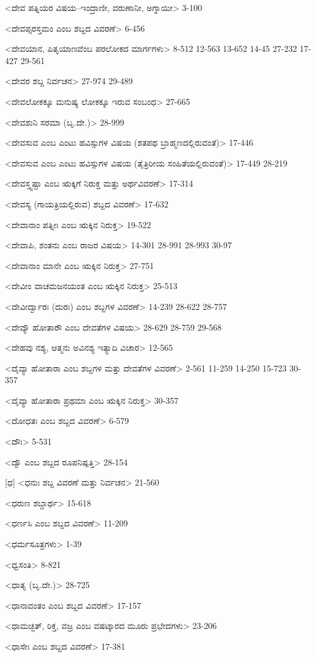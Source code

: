 <ದೇವ ಪತ್ನಿಯರ ವಿಷಯ–ಇಂದ್ರಾಣೀ, ವರುಣಾನೀ, ಅಗ್ನಾಯೀ>
3-100

<ದೇವಪ್ಸರಸ್ತಮಂ ಎಂಬ ಶಬ್ದದ ವಿವರಣೆ>
6-456

<ದೇವಯಾನ, ಪಿತೃಯಾಣವೆಂಬ ಪರಲೋಕದ ಮಾರ್ಗಗಳು>
8-512 
12-563 
13-652
14-45 
27-232 
17-427 
29-561

<ದೇವರ ಶಬ್ದ ನಿರ್ವಚನ>
27-974 
29-489

<ದೇವಲೋಕಕ್ಕೂ ಮನುಷ್ಯ ಲೋಕಕ್ಕೂ ಇರುವ ಸಂಬಂಧ>
27-665

<ದೇವಶುನಿ ಸರಮಾ (ಬೃ.ದೇ.)>
28-999

<ದೇವಸುವ ಎಂಬ ಎಂಟು ಹವಿಸ್ಸುಗಳ ವಿಷಯ (ಶತಪಥ ಬ್ರಾಹ್ಮಣದಲ್ಲಿರುವಂತೆ)>
17-446

<ದೇವಸುವ ಎಂಬ ಎಂಟು ಹವಿಸ್ಸುಗಳ ವಿಷಯ (ತೈತ್ರಿರೀಯ ಸಂಹಿತೆಯಲ್ಲಿರುವಂತೆ)>
17-449 
28-219

<ದೇವಸ್ತ್ವಷ್ಟಾ ಎಂಬ ಋಕ್ಕಿಗೆ ನಿರುಕ್ತ ಮತ್ತು ಅರ್ಥವಿವರಣೆ>
17-314

<ದೇವಸ್ಯ (ಗಾಯತ್ರಿಯಲ್ಲಿರುವ) ಶಬ್ದದ ವಿವರಣೆ>
17-632

<ದೇವಾನಾಂ ಪತ್ನೀಃ ಎಂಬ ಋಕ್ಕಿನ ನಿರುಕ್ತ>
19-522

<ದೇವಾಪಿ, ಶಂತನು ಎಂಬ ರಾಜರ ವಿಷಯ>
14-301
28-991 
28-993 
30-97

<ದೇವಾನಾಂ ಮಾನೇ ಎಂಬ ಋಕ್ಕಿನ ನಿರುಕ್ತ>
27-751

<ದೇವೀಂ ವಾಚಮಜನಯಂತ ಎಂಬ ಋಕ್ಕಿನ ನಿರುಕ್ತ>
25-513

<ದೇವೀರ್ದ್ವಾರಃ (ದುರಃ) ಎಂಬ ಶಬ್ದಗಳ ವಿವರಣೆ>
14-239 
28-622
28-757

<ದೇವ್ಯೌ ಹೋತಾರೌ ಎಂಬ ದೇವತೆಗಳ ವಿಷಯ>
28-629
28-759 
29-568

<ದೇಹವು ನಶ್ಯ, ಆತ್ಮನು ಅವಿನಶ್ಯ ಇತ್ಯಾದಿ ವಿಚಾರ>
12-565

<ದೈವ್ಯಾ ಹೋತಾರಾ ಎಂಬ ಶಬ್ದಗಳ ಮತ್ತು ದೇವತೆಗಳ ವಿವರಣೆ>
2-561 
11-259 
14-250
15-723
30-357

<ದೈವ್ಯಾ ಹೋತಾರಾ ಪ್ರಥಮಾ ಎಂಬ ಋಕ್ಕಿನ ನಿರುಕ್ತ>
30-357

<ದೋಧತಃ ಎಂಬ ಶಬ್ದದ ವಿವರಣೆ>
6-579

<ದೌಃ>
5-531

<ದ್ವೌ ಎಂಬ ಶಬ್ದದ ರೂಪನಿಷ್ಪತ್ತಿ>
28-154

[ಧ]
<ಧನುಃ ಶಬ್ದ ವಿವರಣೆ ಮತ್ತು ನಿರ್ವಚನ>
21-560

<ಧರುಣ ಶಬ್ದಾರ್ಥ>
15-618

<ಧರ್ಣಸಿ ಎಂಬ ಶಬ್ದದ ವಿವರಣೆ>
11-209

<ಧರ್ಮಸೂತ್ರಗಳು>
1-39

<ಧ್ವಸಂತಿ>
8-821

<ಧಾತೃ (ಬೃ.ದೇ.)>
28-725

<ಧಾನಾವಂತಂ ಎಂಬ ಶಬ್ದದ ವಿವರಣೆ>
17-157

<ಧಾಮಚ್ಛತ್‍, ರಿಕ್ತ, ವಜ್ರ ಎಂಬ ವಷಟ್ಕಾರದ ಮೂರು ಪ್ರಭೇದಗಳು>
23-206

<ಧಾಸೇಃ ಎಂಬ ಶಬ್ದದ ವಿವರಣೆ>
17-381

